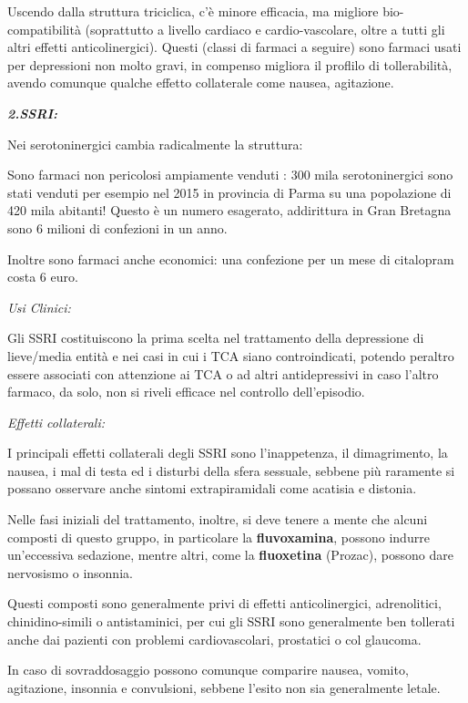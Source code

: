 \documentclass[]{article}
\begin{document}
Uscendo dalla struttura triciclica, c'è minore efficacia, ma migliore
bio-compatibilità (soprattutto a livello cardiaco e cardio-vascolare,
oltre a tutti gli altri effetti anticolinergici). Questi (classi di
farmaci a seguire) sono farmaci usati per depressioni non molto gravi,
in compenso migliora il proflilo di tollerabilità, avendo comunque
qualche effetto collaterale come nausea, agitazione.

\textbf{\emph{2.SSRI:}}

Nei serotoninergici cambia radicalmente la struttura:

Sono farmaci non pericolosi ampiamente venduti : 300 mila
serotoninergici sono stati venduti per esempio nel 2015 in provincia di
Parma su una popolazione di 420 mila abitanti! Questo è un numero
esagerato, addirittura in Gran Bretagna sono 6 milioni di confezioni in
un anno.

Inoltre sono farmaci anche economici: una confezione per un mese di
citalopram costa 6 euro.

\emph{\emph{Usi Clinici:}}

Gli SSRI costituiscono la prima scelta nel trattamento della depressione
di lieve/media entità e nei casi in cui i TCA siano controindicati,
potendo peraltro essere associati con attenzione ai TCA o ad altri
antidepressivi in caso l'altro farmaco, da solo, non si riveli efficace
nel controllo dell'episodio.

\emph{\emph{Effetti collaterali:}}

I principali effetti collaterali degli SSRI sono l'inappetenza, il
dimagrimento, la nausea, i mal di testa ed i disturbi della sfera
sessuale, sebbene più raramente si possano osservare anche sintomi
extrapiramidali come acatisia e distonia.

Nelle fasi iniziali del trattamento, inoltre, si deve tenere a mente che
alcuni composti di questo gruppo, in particolare la
\textbf{fluvoxamina}, possono indurre un'eccessiva sedazione, mentre
altri, come la \textbf{fluoxetina} (Prozac), possono dare nervosismo o
insonnia.

Questi composti sono generalmente privi di effetti anticolinergici,
adrenolitici, chinidino-simili o antistaminici, per cui gli SSRI sono
generalmente ben tollerati anche dai pazienti con problemi
cardiovascolari, prostatici o col glaucoma.

In caso di sovraddosaggio possono comunque comparire nausea, vomito,
agitazione, insonnia e convulsioni, sebbene l'esito non sia generalmente
letale.
\end{document}
